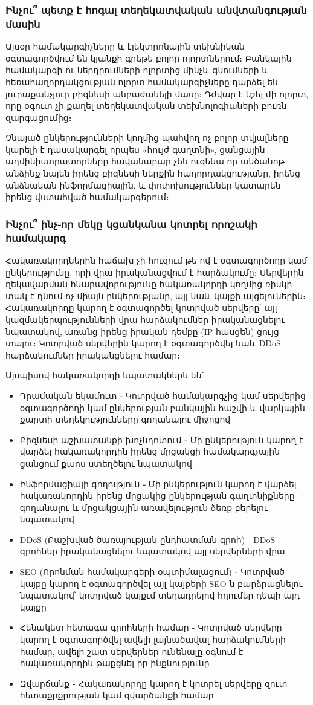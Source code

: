 \documentclass[11pt]{article}
\begin{document}
\begin{sloppypar}
\subsubsection{Ինչու՞ պետք է հոգալ տեղեկատվական անվտանգության մասին}

Այսօր համակարգիչները և էլեկտրոնային տեխնիկան օգտագործվում են
կյանքի գրեթե բոլոր ոլորտներում։ Բանկային համակարգի ու ներդրումների ոլորտից
մինչև գնումների և հեռահաղորդակցության ոլորտ համակարգիչները դարձել են
յուրաքանչյուր բիզնեսի անբաժանելի մասը։ Դժվար է նշել մի ոլորտ, որը
օգուտ չի քաղել տեղեկատվական տեխնոլոգիաների բուռն զարգացումից։

Չնայած ընկերությունների կողմից պահվող ոչ բոլոր տվյալները կարելի է
դասակարգել որպես «հույժ գաղտնի», ցանցային ադմինիստրատորները հավանաբար
չեն ուզենա որ անծանոթ անձինք նայեն իրենց բիզնեսի ներքին հաղորդակցությանը,
իրենց անձնական ինֆորմացիային, և փոփոխություններ կատարեն իրենց վստահված
համակարգերում։

\subsubsection{Ինչու՞ ինչ֊որ մեկը կցանկանա կոտրել որոշակի համակարգ}

Հակառակորդներին հաճախ չի հուզում թե ով է օգտագործողը կամ ընկերությունը,
որի վրա իրականացվում է հարձակումը։
Սերվերին ղեկավարման հնարավորությունը հակառակորդի կողմից ռիսկի տակ է
դնում ոչ միայն ընկերությանը, այլ նաև կայքի այցելուներին։
Հակառակորդը կարող է օգտագործել կոտրված սերվերը՝ այլ կազմակերպությունների
վրա հարձակումներ իրականացնելու նպատակով, առանց իրենց իրական դեմքը
(IP հասցեն) ցույց տալու։ Կոտրված սերվերին կարող է օգտագործվել նաև
DDoS հարձակումներ իրականցնելու համար։

Այսպիսով հակառակորդի նպատակներն են՝

\begin{itemize}
\item Դրամական եկամուտ ֊ Կոտրված համակարգչից կամ սերվերից օգտագործողի
    կամ ընկերության բանկային հաշվի և վարկային քարտի տեղեկությունները
    գողանալու միջոցով
\item Բիզնեսի աշխատանքի խոչնդոտում ֊ Մի ընկերություն կարող է վարձել
    հակառակորդին իրենց մրցակցի համակարգչային ցանցում քաոս ստեղծելու
    նպատակով
\item Ինֆորմացիայի գողություն ֊ Մի ընկերություն կարող է վարձել
    հակառակորդին իրենց մրցակից ընկերության գաղտնիքները գողանալու և
    մրցակցային առավելություն ձեռք բերելու նպատակով
\item DDoS (Բաշխված ծառայության ընդհատման գրոհ) - DDoS գրոհներ
    իրականացնելու նպատակով այլ սերվերների վրա
\item SEO (Որոնման համակարգերի օպտիմալացում) ֊ Կոտրված կայքը կարող է
    օգտագործվել այլ կայքերի SEO-ն բարձրացնելու նպատակով՝ կոտրված կայքւմ
    տեղադրելով հղումեր դեպի այդ կայքը
\item Հենակետ հետագա գրոհների համար ֊ Կոտրված սերվերը կարող է օգտագործվել
    ավելի լայնածավալ հարձակումների համար, ավելի շատ սերվերներ ունենալը
    օգնում է հակառակորդին թաքցնել իր ինքնությունը
\item Զվարճանք ֊ Հակառակորդը կարող է կոտրել սերվերը զուտ հետաքրքրության կամ
    զվարծանքի համար
\end{itemize}



\end{sloppypar}
\end{document}
